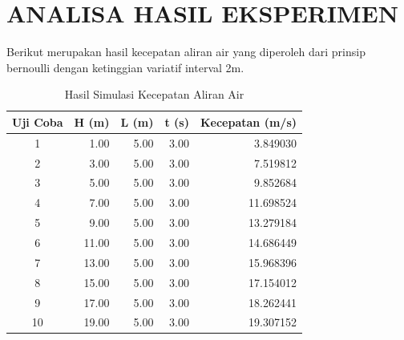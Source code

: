 \documentclass[conference]{IEEEtran}
\begin{document}
\section{ANALISA HASIL EKSPERIMEN}
Berikut merupakan hasil kecepatan aliran air yang diperoleh dari prinsip bernoulli dengan ketinggian variatif interval 2m.
\begin{table}[htbp]
\centering
\caption{Hasil Simulasi Kecepatan Aliran Air}
\label{tab:simulasi_aliran_air}
\renewcommand{\arraystretch}{1.2} %
\begin{tabular}{|c|r|r|r|r|}
\hline
\textbf{Uji Coba} & \textbf{H (m)} & \textbf{L (m)} & \textbf{t (s)} & \textbf{Kecepatan (m/s)} \\
\hline
1  & 1.00  & 5.00 & 3.00 & 3.849030  \\
2  & 3.00  & 5.00 & 3.00 & 7.519812  \\
3  & 5.00  & 5.00 & 3.00 & 9.852684  \\
4  & 7.00  & 5.00 & 3.00 & 11.698524 \\
5  & 9.00  & 5.00 & 3.00 & 13.279184 \\
6  & 11.00 & 5.00 & 3.00 & 14.686449 \\
7  & 13.00 & 5.00 & 3.00 & 15.968396 \\
8  & 15.00 & 5.00 & 3.00 & 17.154012 \\
9  & 17.00 & 5.00 & 3.00 & 18.262441 \\
10 & 19.00 & 5.00 & 3.00 & 19.307152 \\
\hline
\end{tabular}
\end{table}
\end{document}
